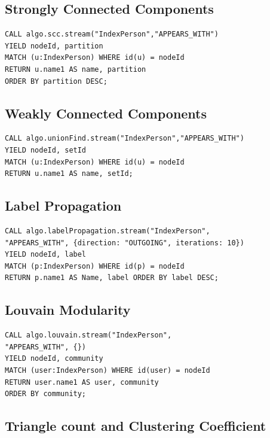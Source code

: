 \documentclass[ngerman,]{scrreprt}
\begin{document}
\subsection{Strongly Connected Components}\label{strongly-connected-components}

\begin{verbatim}
CALL algo.scc.stream("IndexPerson","APPEARS_WITH")
YIELD nodeId, partition
MATCH (u:IndexPerson) WHERE id(u) = nodeId
RETURN u.name1 AS name, partition
ORDER BY partition DESC;
\end{verbatim}

\subsection{Weakly Connected Components}\label{weakly-connected-components}

\begin{verbatim}
CALL algo.unionFind.stream("IndexPerson","APPEARS_WITH")
YIELD nodeId, setId
MATCH (u:IndexPerson) WHERE id(u) = nodeId
RETURN u.name1 AS name, setId;
\end{verbatim}

\subsection{Label Propagation}\label{label-propagation}

\begin{verbatim}
CALL algo.labelPropagation.stream("IndexPerson",
"APPEARS_WITH", {direction: "OUTGOING", iterations: 10})
YIELD nodeId, label
MATCH (p:IndexPerson) WHERE id(p) = nodeId
RETURN p.name1 AS Name, label ORDER BY label DESC;
\end{verbatim}

\subsection{Louvain Modularity}\label{louvain-modularity}

\begin{verbatim}
CALL algo.louvain.stream("IndexPerson",
"APPEARS_WITH", {})
YIELD nodeId, community
MATCH (user:IndexPerson) WHERE id(user) = nodeId
RETURN user.name1 AS user, community
ORDER BY community;
\end{verbatim}

\subsection{Triangle count and Clustering Coefficient}\label{triangle-count-and-clustering-coefficient}
\end{document}
